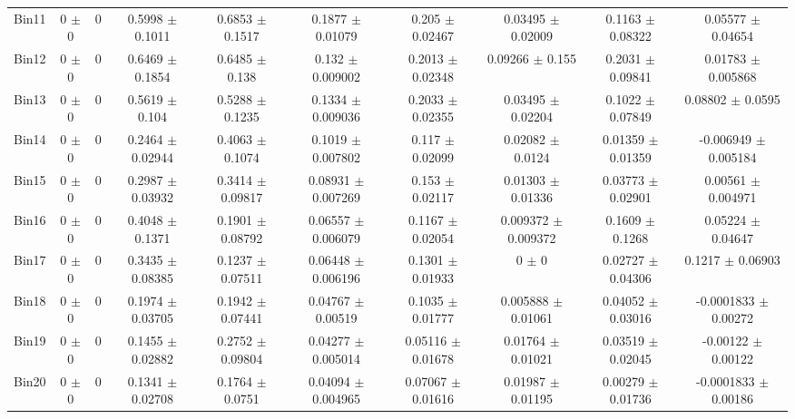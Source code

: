\begin{tabular}{@{\extracolsep{4pt}}lccccccccc@{}}
     Bin11 & 0 $\pm$ 0 & 0 & 0.5998 $\pm$ 0.1011 & 0.6853 $\pm$ 0.1517 & 0.1877 $\pm$ 0.01079 & 0.205 $\pm$ 0.02467 & 0.03495 $\pm$ 0.02009 & 0.1163 $\pm$ 0.08322 & 0.05577 $\pm$ 0.04654 \\ 
     Bin12 & 0 $\pm$ 0 & 0 & 0.6469 $\pm$ 0.1854 & 0.6485 $\pm$ 0.138 & 0.132 $\pm$ 0.009002 & 0.2013 $\pm$ 0.02348 & 0.09266 $\pm$ 0.155 & 0.2031 $\pm$ 0.09841 & 0.01783 $\pm$ 0.005868 \\ 
     Bin13 & 0 $\pm$ 0 & 0 & 0.5619 $\pm$ 0.104 & 0.5288 $\pm$ 0.1235 & 0.1334 $\pm$ 0.009036 & 0.2033 $\pm$ 0.02355 & 0.03495 $\pm$ 0.02204 & 0.1022 $\pm$ 0.07849 & 0.08802 $\pm$ 0.0595 \\ 
     Bin14 & 0 $\pm$ 0 & 0 & 0.2464 $\pm$ 0.02944 & 0.4063 $\pm$ 0.1074 & 0.1019 $\pm$ 0.007802 & 0.117 $\pm$ 0.02099 & 0.02082 $\pm$ 0.0124 & 0.01359 $\pm$ 0.01359 & -0.006949 $\pm$ 0.005184 \\ 
     Bin15 & 0 $\pm$ 0 & 0 & 0.2987 $\pm$ 0.03932 & 0.3414 $\pm$ 0.09817 & 0.08931 $\pm$ 0.007269 & 0.153 $\pm$ 0.02117 & 0.01303 $\pm$ 0.01336 & 0.03773 $\pm$ 0.02901 & 0.00561 $\pm$ 0.004971 \\ 
     Bin16 & 0 $\pm$ 0 & 0 & 0.4048 $\pm$ 0.1371 & 0.1901 $\pm$ 0.08792 & 0.06557 $\pm$ 0.006079 & 0.1167 $\pm$ 0.02054 & 0.009372 $\pm$ 0.009372 & 0.1609 $\pm$ 0.1268 & 0.05224 $\pm$ 0.04647 \\ 
     Bin17 & 0 $\pm$ 0 & 0 & 0.3435 $\pm$ 0.08385 & 0.1237 $\pm$ 0.07511 & 0.06448 $\pm$ 0.006196 & 0.1301 $\pm$ 0.01933 & 0 $\pm$ 0 & 0.02727 $\pm$ 0.04306 & 0.1217 $\pm$ 0.06903 \\ 
     Bin18 & 0 $\pm$ 0 & 0 & 0.1974 $\pm$ 0.03705 & 0.1942 $\pm$ 0.07441 & 0.04767 $\pm$ 0.00519 & 0.1035 $\pm$ 0.01777 & 0.005888 $\pm$ 0.01061 & 0.04052 $\pm$ 0.03016 & -0.0001833 $\pm$ 0.00272 \\ 
     Bin19 & 0 $\pm$ 0 & 0 & 0.1455 $\pm$ 0.02882 & 0.2752 $\pm$ 0.09804 & 0.04277 $\pm$ 0.005014 & 0.05116 $\pm$ 0.01678 & 0.01764 $\pm$ 0.01021 & 0.03519 $\pm$ 0.02045 & -0.00122 $\pm$ 0.00122 \\ 
     Bin20 & 0 $\pm$ 0 & 0 & 0.1341 $\pm$ 0.02708 & 0.1764 $\pm$ 0.0751 & 0.04094 $\pm$ 0.004965 & 0.07067 $\pm$ 0.01616 & 0.01987 $\pm$ 0.01195 & 0.00279 $\pm$ 0.01736 & -0.0001833 $\pm$ 0.00186 \\ 
\hline\hline
  \end{tabular}

